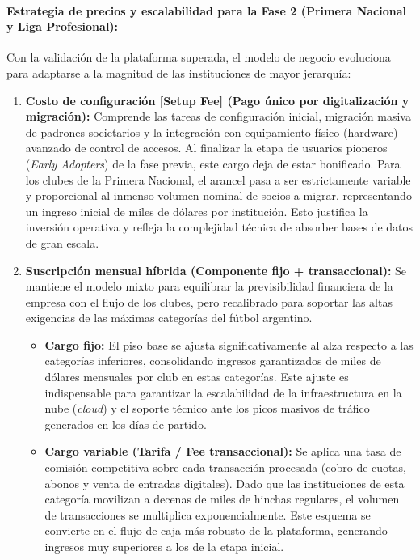 \paragraph{Estrategia de precios y escalabilidad para la Fase 2 (Primera Nacional y Liga Profesional):}

Con la validación de la plataforma superada, el modelo de negocio evoluciona para adaptarse a la magnitud de las instituciones de mayor jerarquía:

\begin{enumerate}
 \item \textbf{Costo de configuración [Setup Fee] (Pago único por digitalización y migración):} Comprende las tareas de configuración inicial, migración masiva de padrones societarios y la integración con equipamiento físico (hardware) avanzado de control de accesos. Al finalizar la etapa de usuarios pioneros (\textit{Early Adopters}) de la fase previa, este cargo deja de estar bonificado. Para los clubes de la Primera Nacional, el arancel pasa a ser estrictamente variable y proporcional al inmenso volumen nominal de socios a migrar, representando un ingreso inicial de miles de dólares por institución. Esto justifica la inversión operativa y refleja la complejidad técnica de absorber bases de datos de gran escala.

  \item \textbf{Suscripción mensual híbrida (Componente fijo + transaccional):} Se mantiene el modelo mixto para equilibrar la previsibilidad financiera de la empresa con el flujo de los clubes, pero recalibrado para soportar las altas exigencias de las máximas categorías del fútbol argentino.
  \begin{itemize}
    \item \textbf{Cargo fijo:} El piso base se ajusta significativamente al alza respecto a las categorías inferiores, consolidando ingresos garantizados de miles de dólares mensuales por club en estas categorías. Este ajuste es indispensable para garantizar la escalabilidad de la infraestructura en la nube (\textit{cloud}) y el soporte técnico ante los picos masivos de tráfico generados en los días de partido.
    \item \textbf{Cargo variable (Tarifa / Fee transaccional):} Se aplica una tasa de comisión competitiva sobre cada transacción procesada (cobro de cuotas, abonos y venta de entradas digitales). Dado que las instituciones de esta categoría movilizan a decenas de miles de hinchas regulares, el volumen de transacciones se multiplica exponencialmente. Este esquema se convierte en el flujo de caja más robusto de la plataforma, generando ingresos muy superiores a los de la etapa inicial.
  \end{itemize}


\end{enumerate}
